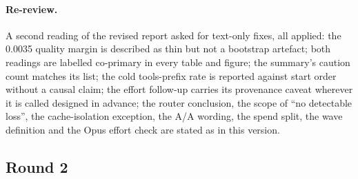 \paragraph{Re-review.} A second reading of the revised report asked for text-only fixes, all applied: the 0.0035
quality margin is described as thin but not a bootstrap artefact; both readings are labelled co-primary in every table
and figure; the summary's caution count matches its list; the cold tools-prefix rate is reported against start order
without a causal claim; the effort follow-up carries its provenance caveat wherever it is called designed in advance;
the router conclusion, the scope of ``no detectable loss'', the cache-isolation exception, the A/A wording, the
spend split, the wave definition and the Opus effort check are stated as in this version.

\subsection*{Round 2}\label{app:round2}

